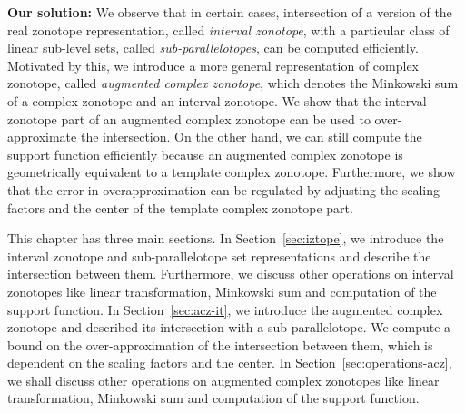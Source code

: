 {\bf Our solution: } We observe that in certain cases, intersection of
a version of the real zonotope representation, called \emph{interval
zonotope}, with a particular class of linear sub-level sets,
called \emph{sub-parallelotopes}, can be computed efficiently.
Motivated by this, we introduce a more general representation of
complex zonotope, called \emph{augmented complex zonotope}, which
denotes the Minkowski sum of a complex zonotope and an interval
zonotope.  We show that the interval zonotope part of an augmented
complex zonotope can be used to over-approximate the intersection.  On
the other hand, we can still compute the support function efficiently
because an augmented complex zonotope is geometrically equivalent to a
template complex zonotope.  Furthermore, we show that the error in
overapproximation can be regulated by adjusting the scaling factors
and the center of the template complex zonotope part.

This chapter has three main sections.  In Section~\ref{sec:iztope}, we
introduce the interval zonotope and sub-parallelotope set
representations and describe the intersection between them.
Furthermore, we discuss other operations on interval zonotopes like
linear transformation, Minkowski sum and computation of the support
function.  In Section~\ref{sec:acz-it}, we introduce the augmented
complex zonotope and described its intersection with a
sub-parallelotope.  We compute a bound on the over-approximation of
the intersection between them, which is dependent on the scaling
factors and the center.  In Section~\ref{sec:operations-acz}, we shall
discuss other operations on augmented complex zonotopes like linear
transformation, Minkowski sum and computation of the support function.
